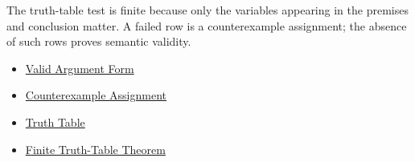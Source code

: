 \begin{remark*}[Interpretation]
The truth-table test is finite because only the variables appearing in the
premises and conclusion matter. A failed row is a counterexample assignment; the
absence of such rows proves semantic validity.
\end{remark*}

\begin{dependencies}
\begin{itemize}
  \item \hyperref[def:valid-argument-form-propositional-logic]{Valid Argument Form}
  \item \hyperref[def:counterexample-assignment-propositional-logic]{Counterexample Assignment}
  \item \hyperref[def:truth-table-propositional-logic]{Truth Table}
  \item \hyperref[thm:finite-truth-table-propositional-logic]{Finite Truth-Table Theorem}
\end{itemize}
\end{dependencies}
